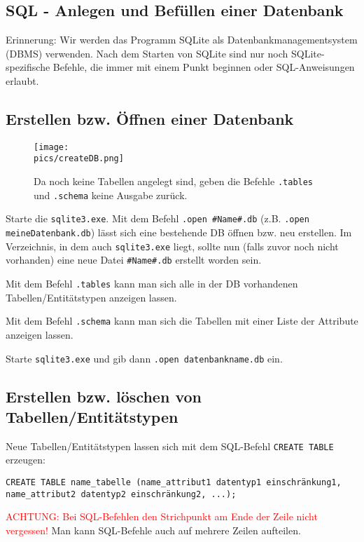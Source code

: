 \subsection[Anlegen/Befüllen einer DB]{SQL - Anlegen und Befüllen einer Datenbank}
Erinnerung: Wir werden das Programm SQLite als Datenbankmanagementsystem (DBMS) verwenden. Nach dem Starten von SQLite sind nur noch SQLite-spezifische Befehle, die immer mit einem Punkt beginnen oder SQL-Anweisungen erlaubt.

\subsection{Erstellen bzw. Öffnen einer Datenbank}
\begin{wrapfigure}{r}{6.91cm}
	\centering
	\texttt{[image: \\pics/createDB.png]}
	\caption*{Da noch keine Tabellen angelegt sind, geben die Befehle \lstinline!.tables! und \lstinline!.schema! keine Ausgabe zurück.}
\end{wrapfigure}
Starte die \texttt{sqlite3.exe}. Mit dem Befehl \lstinline!.open #Name#.db! (z.B. \lstinline!.open meineDatenbank.db!) lässt sich eine bestehende DB öffnen bzw. neu erstellen. Im Verzeichnis, in dem auch \texttt{sqlite3.exe} liegt, sollte nun (falls zuvor noch nicht vorhanden) eine neue Datei \texttt{\#Name\#.db} erstellt worden sein.

Mit dem Befehl \lstinline!.tables! kann man sich alle in der DB vorhandenen Tabellen/Entitätstypen anzeigen lassen.

Mit dem Befehl \lstinline!.schema! kann man sich die Tabellen mit einer Liste der Attribute anzeigen lassen.
\begin{tcolorbox}[title=Datenbank öffnen]
	Starte \texttt{sqlite3.exe} und gib dann \lstinline!.open datenbankname.db! ein.
\end{tcolorbox}

\subsection{Erstellen bzw. löschen von Tabellen/Entitätstypen}
Neue Tabellen/Entitätstypen lassen sich mit dem SQL-Befehl \lstinline!CREATE TABLE! erzeugen:

\begin{tcolorbox}[title=Tabellen erstellen]
	\lstinline[breaklines=true]!CREATE TABLE name_tabelle (name_attribut1 datentyp1 einschränkung1, name_attribut2 datentyp2 einschränkung2, ...);!
\end{tcolorbox}
\textcolor{red}{ACHTUNG: Bei SQL-Befehlen den Strichpunkt am Ende der Zeile nicht vergessen!} Man kann SQL-Befehle auch auf mehrere Zeilen aufteilen.

